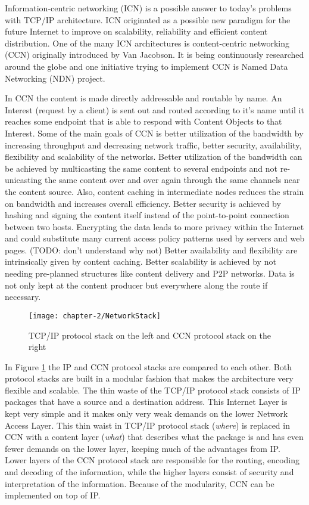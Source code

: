 Information-centric networking (ICN) is a possible answer to today's problems with TCP/IP architecture. ICN originated as a possible new paradigm for the future Internet to improve on scalability, reliability and efficient content distribution. One of the many ICN architectures is content-centric networking (CCN) originally introduced by Van Jacobson. It is being continuously researched around the globe and one initiative trying to implement CCN is Named Data Networking (NDN) project.

\vspace{5mm} %

In CCN the content is made directly addressable and routable by name. An Interest (request by a client) is sent out and routed according to it's name until it reaches some endpoint that is able to respond with Content Objects to that Interest. Some of the main goals of CCN is better utilization of the bandwidth by increasing throughput and decreasing network traffic, better security, availability, flexibility and scalability of the networks. Better utilization of the bandwidth can be achieved by multicasting the same content to several endpoints and not re-unicasting the same content over and over again through the same channels near the content source. Also, content caching in intermediate nodes reduces the strain on bandwidth and increases overall efficiency. Better security is achieved by hashing and signing the content itself instead of the point-to-point connection between two hosts. Encrypting the data leads to more privacy within the Internet and could substitute many current access policy patterns used by servers and web pages. (TODO: don't understand why not) Better availability and flexibility are intrinsically given by content caching. Better scalability is achieved by not needing pre-planned structures like content delivery and P2P networks. Data is not only kept at the content producer but everywhere along the route if necessary.

\begin{figure}[H]
  \centering
  \texttt{[image: chapter-2/NetworkStack]}
  \caption{TCP/IP protocol stack on the left and CCN protocol stack on the right}
  \label{fig:NetworkStack}
\end{figure}

In Figure \ref{fig:NetworkStack} the IP and CCN protocol stacks are compared to each other. Both protocol stacks are built in a modular fashion that makes the architecture very flexible and scalable. The thin waste of the TCP/IP protocol stack consists of IP packages that have a source and a destination address. This Internet Layer is kept very simple and it makes only very weak demands on the lower Network Access Layer. This thin waist in TCP/IP protocol stack (\emph{where}) is replaced in CCN with a content layer (\emph{what}) that describes what the package is and has even fewer demands on the lower layer, keeping much of the advantages from IP. Lower layers of the CCN protocol stack are responsible for the routing, encoding and decoding of the information, while the higher layers consist of security and interpretation of the information. Because of the modularity, CCN can be implemented on top of IP.

